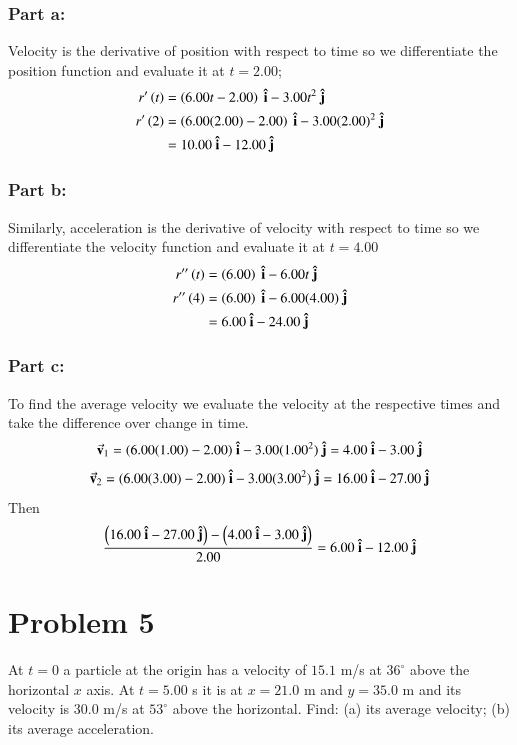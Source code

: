 \documentclass{article}
\begin{document}
\subsubsection*{Part a:}
Velocity is the derivative of position with respect to time so we differentiate the position function and evaluate it at $t=2.00$;
\begin{align*}
	r^\prime \left( t \right) &= \left(6.00 t - 2.00 \right)\ \vu i - 3.00t^2\ \vu j \\
	r^\prime \left( 2 \right) &= \left(6.00 (2.00) - 2.00 \right)\ \vu i - 3.00(2.00)^2\ \vu j \\
				  &= 10.00\ \vu i - 12.00\ \vu j
\end{align*}
\subsubsection*{Part b:}
Similarly, acceleration is the derivative of velocity with respect to time so we differentiate the velocity function and evaluate it at $t=4.00$
\begin{align*}
	r^{\prime\prime} \left( t \right) &= \left(6.00\right)\ \vu i - 6.00t\ \vu j \\
	r^{\prime\prime} \left( 4 \right) &= \left(6.00\right)\ \vu i - 6.00(4.00)\ \vu j \\
				  &= 6.00\ \vu i - 24.00\ \vu j
\end{align*}

\subsubsection*{Part c:}
To find the average velocity we evaluate the velocity at the respective times and take the difference over change in time.
\[
	\va v_1 = (6.00(1.00) - 2.00)\ \vu i - 3.00(1.00^2)\ \vu j  = 4.00\ \vu i - 3.00\ \vu j
\]
\[
	\va v_2 = (6.00(3.00) - 2.00)\ \vu i - 3.00(3.00^2)\ \vu j = 16.00\ \vu i - 27.00\ \vu j
\]
Then
\[
	\frac{\left( 16.00\ \vu i - 27.00\ \vu j \right) - \left( 4.00\ \vu i - 3.00\ \vu j \right)}{2.00} = 6.00\ \vu i -12.00\ \vu j
\]

\section*{Problem 5}
At $t = 0$ a particle at the origin has a velocity of $15.1$ m/s at $36^\circ$ above the horizontal $x$ axis.
At $t = 5.00$ s it is at $x = 21.0$ m and $y = 35.0$ m and its velocity is 30.0 m/s at $53^\circ$ above the horizontal.
Find: (a) its average velocity; (b) its average acceleration.
\end{document}
